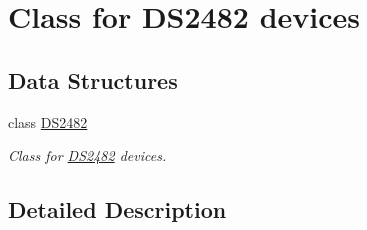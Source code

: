 \hypertarget{group___device}{}\section{Class for D\+S2482 devices}
\label{group___device}
\subsection*{Data Structures}
\begin{DoxyCompactItemize}
\item 
class \mbox{\hyperlink{class_d_s2482}{D\+S2482}}
\begin{DoxyCompactList}\small\item\em Class for \mbox{\hyperlink{class_d_s2482}{D\+S2482}} devices. \end{DoxyCompactList}\end{DoxyCompactItemize}


\subsection{Detailed Description}
